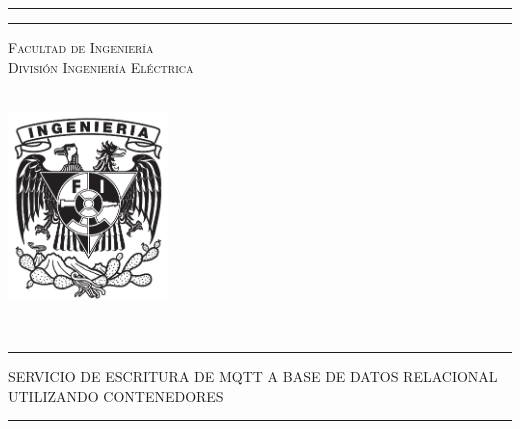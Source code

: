 \begin{titlepage}
\begin{minipage}[c][0.195\textheight][t]{0.75\textwidth}
\begin{center}
                    {\color{black}\hrule height2pt}
                    \vspace{.2cm}
                           {\color{black}\hrule height1pt}
                           \vspace{1.5cm}
                           \textsc{\LARGE Facultad de Ingeniería\\ División Ingeniería Eléctrica}
    \end{center}
  \end{minipage}
  \begin{minipage}[c][0.81\textheight][t]{0.25\textwidth}
    \vspace*{5mm}
    \begin{center}
      \hskip0.5mm
             \vspace{5mm}
             \hskip2pt
                 {\color{black}\vrule width3pt height13cm}
                 \hskip2mm
                     {\color{black}\vrule width1pt height13cm} \\
                     \vspace{5mm}
                     \hspace*{-15mm}
             \includegraphics[height=5cm]{Imagenes/escudofi_negro.jpg}
    \end{center}
  \end{minipage}
  \begin{minipage}[c][0.81\textheight][t]{0.75\textwidth}
    \begin{center}
      \vspace{2cm}

      {\color{black}{\LARGE \scshape Laboratorio de Instrumentación Electrónica de Sistemas Espaciales}\\[.2in]
      \vspace{4 cm}            
{\color{black}\hrule height1pt}
\vspace{0.25 cm}  
\begin{center}
\LARGE \scshape SERVICIO DE ESCRITURA DE MQTT A BASE DE DATOS RELACIONAL UTILIZANDO CONTENEDORES
\vspace{0.25 cm}  
{\color{black}\hrule height1pt}
\vspace{3 cm}
\end{center}

 }

    \end{center}
  \end{minipage}
\end{titlepage}
